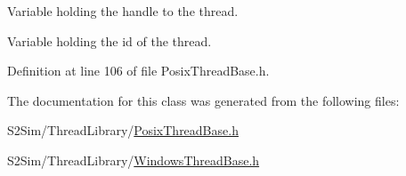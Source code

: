 Variable holding the handle to the thread. 

Variable holding the id of the thread. 

Definition at line 106 of file Posix\-Thread\-Base.\-h.



The documentation for this class was generated from the following files\-:\begin{DoxyCompactItemize}
\item 
S2\-Sim/\-Thread\-Library/\hyperlink{_posix_thread_base_8h}{Posix\-Thread\-Base.\-h}\item 
S2\-Sim/\-Thread\-Library/\hyperlink{_windows_thread_base_8h}{Windows\-Thread\-Base.\-h}\end{DoxyCompactItemize}
